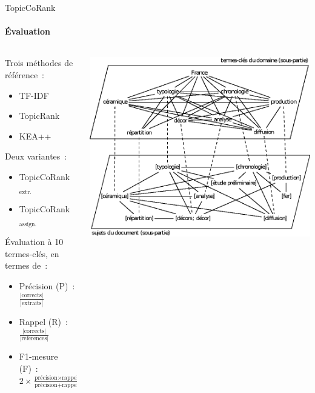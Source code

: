 \begin{frame}{TopicCoRank}\framesubtitle{Évaluation}
  \begin{columns}
    \begin{column}{.6\textwidth}
      Trois méthodes de référence~:
      \begin{itemize}
        \item{TF-IDF~\cite{salton1975tfidf}}
        \item{TopicRank~\cite{bougouin2013topicrank}}
        \item{KEA++~\cite{medelyan2006kea++}}
      \end{itemize}

      \vspace{1em}

      Deux variantes~:
      \begin{itemize}
        \item{TopicCoRank$_\text{extr.}$}
        \item{TopicCoRank$_\text{assign.}$}
      \end{itemize}

      \vspace{1em}

      Évaluation à 10 termes-clés, en termes de~:
      \begin{itemize}
        \item{Précision (P)~: $\frac{|\text{corrects}|}{|\text{extraits}|}$}
        \item{Rappel (R)~: $\frac{|\text{corrects}|}{|\text{references}|}$}
        \item{F1-mesure (F)~: $2 \times \frac{\text{précision} \times \text{rappel}}{\text{précision} + \text{rappel}}$}
      \end{itemize}
    \end{column}

    \begin{column}{.4\textwidth}
      \centering
      \includegraphics[width=.8\textwidth]{include/topiccorank_graph.eps}
    \end{column}
  \end{columns}
\end{frame}

